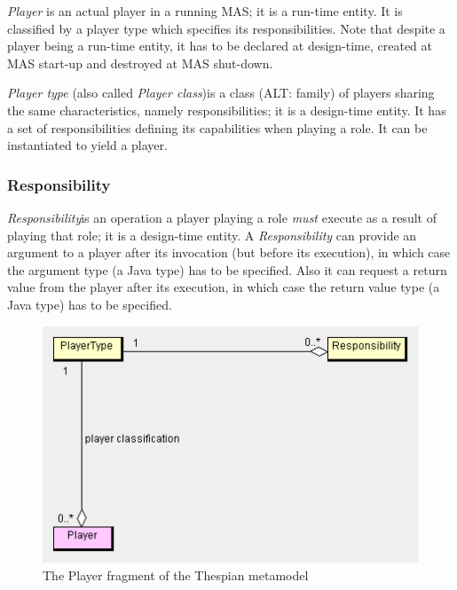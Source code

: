 \textit{Player} is an actual player in a running MAS; it is a run-time entity.
It is classified by a player type which specifies its responsibilities.
Note that despite a player being a run-time entity, it has to be declared at design-time, created at MAS start-up and destroyed at MAS shut-down.

\textit{Player type} (also called \textit{Player class})is a class (ALT: family) of players sharing the same characteristics, namely responsibilities; it is a design-time entity.
It has a set of responsibilities defining its capabilities when playing a role.
It can be instantiated to yield a player. 

\subsubsection*{Responsibility}

\textit{Responsibility}is an operation a player playing a role \textit{must} execute as a result of playing that role; it is a design-time entity. 
A \textit{Responsibility} can provide an argument to a player after its invocation (but before its execution), in which case the argument type (a Java type) has to be specified.
Also it can request a return value from the player after its execution, in which case the return value type (a Java type) has to be specified.

\begin{figure}[ht]
	\centering
	\includegraphics[width=\textwidth]{images/thespian/player-metamodel.png}
	\caption{The Player fragment of the Thespian metamodel}
	\label{figure:thespian-player-metamodel}
\end{figure}

